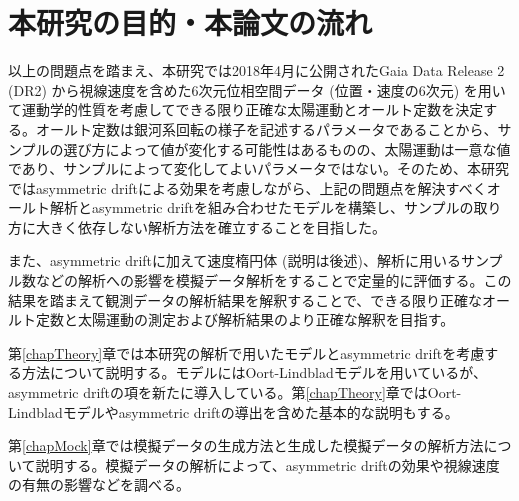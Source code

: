 \section{本研究の目的・本論文の流れ}



以上の問題点を踏まえ、本研究では2018年4月に公開されたGaia Data Release 2 (DR2) から視線速度を含めた6次元位相空間データ (位置・速度の6次元) を用いて運動学的性質を考慮してできる限り正確な太陽運動とオールト定数を決定する。オールト定数は銀河系回転の様子を記述するパラメータであることから、サンプルの選び方によって値が変化する可能性はあるものの、太陽運動は一意な値であり、サンプルによって変化してよいパラメータではない。そのため、本研究ではasymmetric driftによる効果を考慮しながら、上記の問題点を解決すべくオールト解析とasymmetric driftを組み合わせたモデルを構築し、サンプルの取り方に大きく依存しない解析方法を確立することを目指した。

また、asymmetric driftに加えて速度楕円体 (説明は後述)、解析に用いるサンプル数などの解析への影響を模擬データ解析をすることで定量的に評価する。この結果を踏まえて観測データの解析結果を解釈することで、できる限り正確なオールト定数と太陽運動の測定および解析結果のより正確な解釈を目指す。

第\ref{chapTheory}章では本研究の解析で用いたモデルとasymmetric driftを考慮する方法について説明する。モデルにはOort-Lindbladモデルを用いているが、asymmetric driftの項を新たに導入している。第\ref{chapTheory}章ではOort-Lindbladモデルやasymmetric driftの導出を含めた基本的な説明もする。

第\ref{chapMock}章では模擬データの生成方法と生成した模擬データの解析方法について説明する。模擬データの解析によって、asymmetric driftの効果や視線速度の有無の影響などを調べる。

